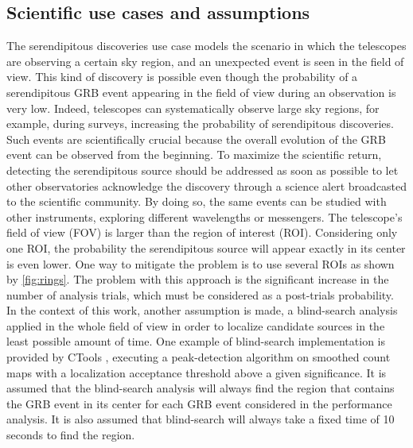 \subsection{Scientific use cases and assumptions}
The serendipitous discoveries use case models the scenario in which the telescopes are observing a certain sky region, and an unexpected event is seen in the field of view. This kind of discovery is possible even though the probability of a serendipitous GRB event appearing in the field of view during an observation is very low. Indeed, telescopes can systematically observe large sky regions, for example, during surveys, increasing the probability of serendipitous discoveries. Such events are scientifically crucial because the overall evolution of the GRB event can be observed from the beginning. To maximize the scientific return, detecting the serendipitous source should be addressed as soon as possible to let other observatories acknowledge the discovery through a science alert broadcasted to the scientific community. By doing so, the same events can be studied with other instruments, exploring different wavelengths or messengers. 
The telescope's field of view (FOV) is larger than the region of interest (ROI). Considering only one ROI, the probability the serendipitous source will appear exactly in its center is even lower. One way to mitigate the problem is to use several ROIs as shown by \autoref{fig:rings}. The problem with this approach is the significant increase in the number of analysis trials, which must be considered as a post-trials probability. In the context of this work, another assumption is made, a blind-search analysis applied in the whole field of view in order to localize candidate sources in the least possible amount of time. One example of blind-search implementation is provided by CTools \cite{Knodlseder_2016}, executing a peak-detection algorithm on smoothed count maps with a localization acceptance threshold above a given significance. It is assumed that the blind-search analysis will always find the region that contains the GRB event in its center for each GRB event considered in the performance analysis. It is also assumed that blind-search will always take a fixed time of 10 seconds to find the region. 

